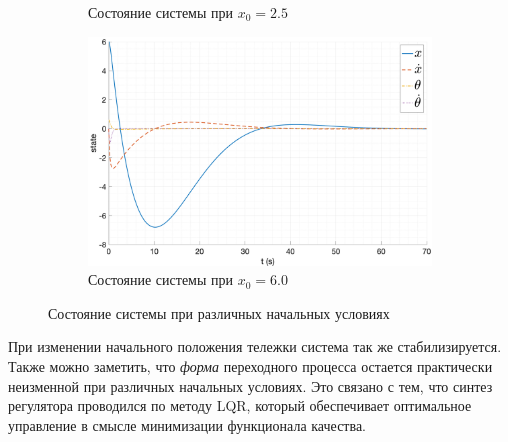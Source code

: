 \begin{figure}[ht!]
\begin{subfigure}[b]{0.45\textwidth}
        \caption{Состояние системы при $x_0 = 2.5$}
    \end{subfigure} 
    \begin{subfigure}[b]{0.45\textwidth}
        \centering
        \includegraphics[width=\textwidth]{media/plots/LQR/state_9.png}
        \caption{Состояние системы при $x_0 = 6.0$}
    \end{subfigure}
    \caption{Состояние системы при различных начальных условиях}
    \label{fig:lqr_controller_3_state}
\end{figure}
При изменении начального положения тележки система так же стабилизируется. 
Также можно заметить, что \textit{форма} переходного процесса остается практически неизменной при различных начальных условиях.
Это связано с тем, что синтез регулятора проводился по методу LQR, который обеспечивает оптимальное
управление в смысле минимизации функционала качества. 

\FloatBarrier
